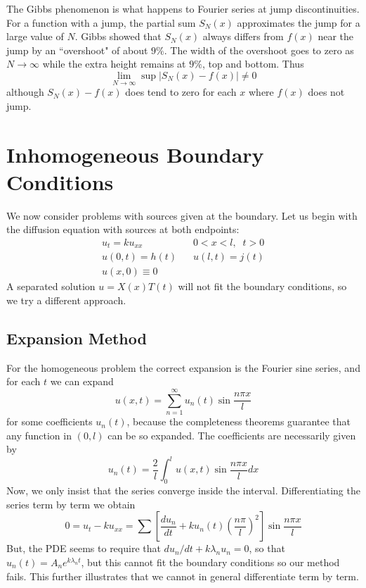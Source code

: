 The Gibbs phenomenon is what happens to Fourier series at jump discontinuities. For a function with a jump, the partial sum $S_N(x)$ approximates the jump for a large value of $N$. Gibbs showed that $S_N(x)$ always differs from $f(x)$ near the jump by an ``overshoot" of about $9\%$. The width of the overshoot goes to zero as $N\rightarrow \infty$ while the extra height remains at $9\%$, top and bottom. Thus \begin{equation*}
    \lim\limits_{N\rightarrow \infty}\sup|S_N(x) - f(x)| \neq 0
\end{equation*}
although $S_N(x)-f(x)$ does tend to zero for each $x$ where $f(x)$ does not jump.



\section{Inhomogeneous Boundary Conditions}


We now consider problems with sources given at the boundary. Let us begin with the diffusion equation with sources at both endpoints: \begin{align*}
    u_t=ku_{xx}&\;\;\;0 < x < l,\;\;t > 0 \\
    u(0,t)=h(t)&\;\;\;u(l,t) = j(t) \\
    u(x,0) \equiv 0&
\end{align*}
A separated solution $u=X(x)T(t)$ will not fit the boundary conditions, so we try a different approach.

\subsection{Expansion Method}

For the homogeneous problem the correct expansion is the Fourier sine series, and for each $t$ we can expand \begin{equation}
    u(x,t) = \sum_{n=1}^{\infty}u_n(t)\sin\frac{n\pi x}{l}
\end{equation}
for some coefficients $u_n(t)$, because the completeness theorems guarantee that any function in $(0,l)$ can be so expanded. The coefficients are necessarily given by \begin{equation*}
    u_n(t) = \frac{2}{l}\int_0^lu(x,t)\sin\frac{n\pi x}{l}dx
\end{equation*}
Now, we only insist that the series converge inside the interval. Differentiating the series term by term we obtain \begin{equation*}
    0 = u_t - ku_{xx} = \sum\left[\frac{d u_n}{dt} + ku_n(t)\left(\frac{n\pi}{l}\right)^2\right]\sin\frac{n\pi x}{l}
\end{equation*}
But, the PDE seems to require that $du_n/dt + k\lambda_nu_n = 0$, so that $u_n(t) = A_ne^{k\lambda_n t}$, but this cannot fit the boundary conditions so our method fails. This further illustrates that we cannot in general differentiate term by term.


